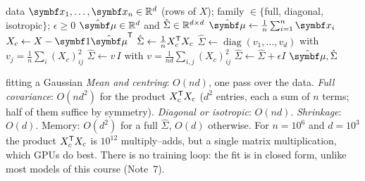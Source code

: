 \documentclass[11pt]{article}
\begin{document}
\begin{algorithm}[htbp]
\caption{Fitting a Gaussian by maximum likelihood, with optional shrinkage}\label{alg:gaussfit}
\begin{algorithmic}[1]
\Require data $\x_1, \dots, \x_n \in \R^d$ (rows of $X$); family $\in \{$full, diagonal, isotropic$\}$; $\epsilon \ge 0$
\Ensure $\hat{\vmu} \in \R^d$ and $\hat\Sigma \in \mathbb{R}^{d \times d}$
  \State $\hat{\vmu} \gets \frac1n\sum_{i=1}^n \x_i$ 
  \State $X_c \gets X - \vect{1}\hat{\vmu}\T$ 
    \State $\hat\Sigma \gets \frac1n X_c^{\mathsf{T}} X_c$ 
    \State $\hat\Sigma \gets \operatorname{diag}(v_1, \dots, v_d)$ with $v_j = \frac1n\sum_i (X_c)_{ij}^2$
  \Else
    \State $\hat\Sigma \gets v\,I$ with $v = \frac{1}{nd}\sum_{i,j} (X_c)_{ij}^2$
  \EndIf
  \State $\hat\Sigma \gets \hat\Sigma + \epsilon I$ 
  \State \Return $\hat{\vmu}, \hat\Sigma$
\EndFunction
\end{algorithmic}
\end{algorithm}

\begin{runtime}{fitting a Gaussian}
\emph{Mean and centring}: $O(nd)$, one pass over the data. \emph{Full covariance}: $O(nd^2)$ for the product
$X_c^{\mathsf{T}} X_c$ ($d^2$ entries, each a sum of $n$ terms; half of them suffice by symmetry). \emph{Diagonal or
isotropic}: $O(nd)$. \emph{Shrinkage}: $O(d)$. Memory: $O(d^2)$ for a full $\hat\Sigma$, $O(d)$ otherwise. For $n = 10^6$ and $d = 10^3$ the product $X_c^{\mathsf{T}} X_c$
is $10^{12}$ multiply--adds, but a single matrix multiplication, which GPUs do best. There is no training loop: the
fit is in closed form, unlike most models of this course (Note~7).
\end{runtime}
\end{document}
